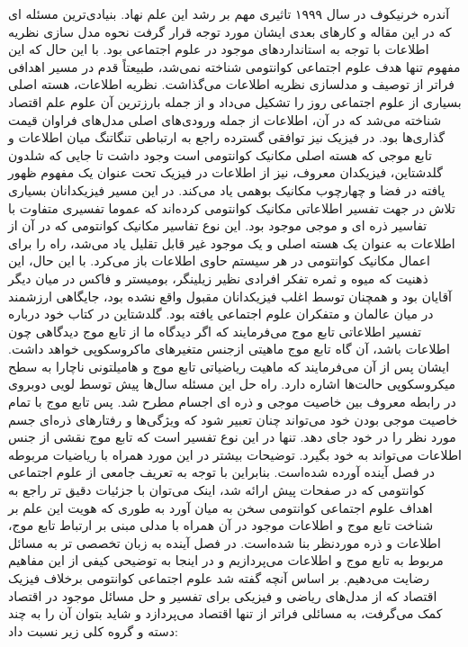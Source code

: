 \documentclass[a4paper,titlepage,12pt,fleqn,oneside]{report}
\begin{document}
آندره خرنیکوف  در سال ۱۹۹۹ تاثیری مهم بر رشد این علم نهاد. بنیادی‌ترین مسئله ای که در این مقاله و کارهای بعدی ایشان\cite{kh3} مورد توجه قرار گرفت نحوه مدل سازی نظریه اطلاعات با توجه به استانداردهای موجود در علوم اجتماعی بود. با این حال که این مفهوم تنها هدف علوم اجتماعی کوانتومی شناخته نمی‌شد، طبیعتاً قدم در مسیر اهدافی فراتر از توصیف و مدلسازی نظریه اطلاعات می‌گذاشت. نظریه اطلاعات، هسته اصلی بسیاری از علوم اجتماعی روز را تشکیل می‌داد و از جمله بارزترین آن علوم علم اقتصاد شناخته می‌شد که در آن، اطلاعات از جمله ورودی‌های اصلی مدل‌های فراوان قیمت گذاری‌ها بود. در فیزیک نیز توافقی گسترده راجع به ارتباطی تنگاتنگ میان اطلاعات و تابع موجی که هسته اصلی مکانیک کوانتومی است وجود داشت تا جایی که شلدون گلدشتاین، فیزیکدان معروف، نیز  از اطلاعات در فیزیک تحت عنوان یک مفهوم ظهور یافته در فضا و چهارچوب مکانیک بوهمی یاد می‌کند\cite{gold}.  در این مسیر فیزیکدانان بسیاری تلاش در جهت تفسیر اطلاعاتی مکانیک کوانتومی کرده‌اند که عموما تفسیری متفاوت با تفاسیر ذره ای و موجی موجود بود. این نوع تفاسیر مکانیک کوانتومی که در آن از اطلاعات به عنوان یک هسته اصلی و یک موجود غیر قابل تقلیل یاد می‌شد، راه را برای اعمال مکانیک کوانتومی در هر سیستم حاوی اطلاعات باز می‌کرد. با این حال، این ذهنیت که میوه و ثمره تفکر افرادی نظیر زیلینگر، بومیستر\cite{boosem} و فاکس\cite{fucks}  در میان دیگر آقایان بود و همچنان توسط اغلب فیزیکدانان مقبول واقع نشده بود، جایگاهی ارزشمند در میان عالمان و متفکران علوم اجتماعی یافته بود. گلدشتاین در کتاب خود درباره تفسیر اطلاعاتی تابع موج می‌فرمایند که اگر دیدگاه ما از تابع موج دیدگاهی چون اطلاعات باشد، آن گاه تابع موج ماهیتی ازجنس متغیرهای ماکروسکوپی خواهد داشت. ایشان پس از آن می‌فرمایند که ماهیت ریاضیاتی تابع موج و هامیلتونی ناچارا به سطح میکروسکوپی حالت‌ها اشاره دارد. راه حل این مسئله سال‌ها پیش توسط لویی دوبروی در رابطه معروف بین خاصیت موجی و ذره ای اجسام مطرح شد. پس تابع موج با تمام خاصیت موجی بودن خود می‌تواند چنان تعبیر شود که ویژگی‌ها و رفتارهای ذره‌ای جسم مورد نظر را در خود جای دهد. تنها در این نوع تفسیر است که تابع موج نقشی از جنس اطلاعات می‌تواند به خود بگیرد. توضیحات بیشتر در این مورد همراه با ریاضیات مربوطه در فصل آینده آورده شده‌است. بنابراین با توجه به تعریف جامعی از علوم اجتماعی کوانتومی که در صفحات پیش ارائه شد، اینک می‌توان با جزئیات دقیق تر راجع به اهداف علوم اجتماعی کوانتومی سخن به میان آورد به طوری که هویت این علم بر شناخت تابع موج و اطلاعات موجود در آن همراه با مدلی مبنی بر ارتباط تابع موج، اطلاعات و ذره موردنظر بنا شده‌است. در فصل آینده به زبان تخصصی تر به مسائل مربوط به تابع موج و اطلاعات می‌پردازیم و در اینجا به توضیحی کیفی از این مفاهیم رضایت می‌دهیم. بر اساس آنچه گفته شد علوم اجتماعی کوانتومی برخلاف فیزیک اقتصاد که از مدل‌های ریاضی و فیزیکی برای تفسیر و حل مسائل موجود در اقتصاد کمک می‌گرفت، به مسائلی فراتر از تنها اقتصاد می‌پردازد و شاید بتوان آن را به چند دسته و گروه کلی زیر نسبت داد:\\
\end{document}
